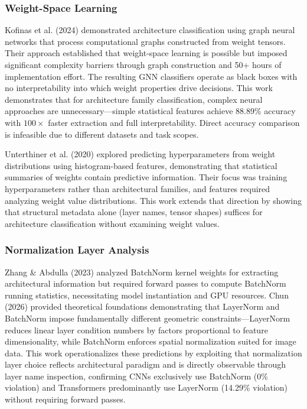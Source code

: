 
\subsubsection{Weight-Space Learning}

Kofinas et al. (2024) demonstrated architecture classification using graph neural networks that process computational graphs constructed from weight tensors. Their approach established that weight-space learning is possible but imposed significant complexity barriers through graph construction and 50+ hours of implementation effort. The resulting GNN classifiers operate as black boxes with no interpretability into which weight properties drive decisions. This work demonstrates that for architecture family classification, complex neural approaches are unnecessary---simple statistical features achieve 88.89\% accuracy with $100\times$ faster extraction and full interpretability. Direct accuracy comparison is infeasible due to different datasets and task scopes.

Unterthiner et al. (2020) explored predicting hyperparameters from weight distributions using histogram-based features, demonstrating that statistical summaries of weights contain predictive information. Their focus was training hyperparameters rather than architectural families, and features required analyzing weight value distributions. This work extends that direction by showing that structural metadata alone (layer names, tensor shapes) suffices for architecture classification without examining weight values.

\subsubsection{Normalization Layer Analysis}

Zhang \& Abdulla (2023) analyzed BatchNorm kernel weights for extracting architectural information but required forward passes to compute BatchNorm running statistics, necessitating model instantiation and GPU resources. Chun (2026) provided theoretical foundations demonstrating that LayerNorm and BatchNorm impose fundamentally different geometric constraints---LayerNorm reduces linear layer condition numbers by factors proportional to feature dimensionality, while BatchNorm enforces spatial normalization suited for image data. This work operationalizes these predictions by exploiting that normalization layer choice reflects architectural paradigm and is directly observable through layer name inspection, confirming CNNs exclusively use BatchNorm (0\% violation) and Transformers predominantly use LayerNorm (14.29\% violation) without requiring forward passes.

